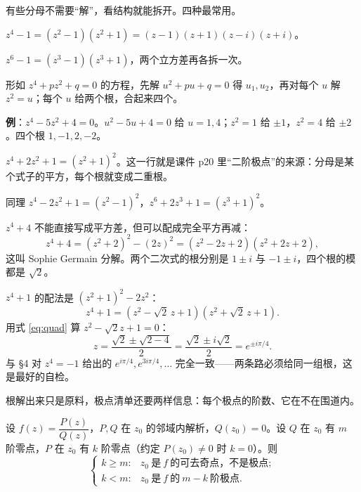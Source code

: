 \documentclass[11pt]{ctexart}
\let\origsubhdr\subhdr
\renewcommand{\subhdr}[1]{\par\needspace{4\baselineskip}\origsubhdr{#1}}
\let\orighdr\hdr
\renewcommand{\hdr}[2]{\par\orighdr{#1}{#2}}
\begin{document}


有些分母不需要“解”，看结构就能拆开。四种最常用。


$z^{4}-1=(z^{2}-1)(z^{2}+1)=(z-1)(z+1)(z-i)(z+i)$。

$z^{6}-1=(z^{3}-1)(z^{3}+1)$，两个立方差再各拆一次。


形如 $z^{4}+pz^{2}+q=0$ 的方程，先解 $u^{2}+pu+q=0$ 得 $u_1,u_2$，再对每个 $u$ 解 $z^{2}=u$；每个 $u$ 给两个根，合起来四个。

\textbf{例}：$z^{4}-5z^{2}+4=0$。$u^{2}-5u+4=0$ 给 $u=1,4$；$z^{2}=1$ 给 $\pm1$，$z^{2}=4$ 给 $\pm2$。四个根 $1,-1,2,-2$。


$z^{4}+2z^{2}+1=(z^{2}+1)^{2}$。这一行就是课件 p20 里“二阶极点”的来源：分母是某个式子的平方，每个根就变成二重根。

同理 $z^{4}-2z^{2}+1=(z^{2}-1)^{2}$，$z^{6}+2z^{3}+1=(z^{3}+1)^{2}$。


$z^{4}+4$ 不能直接写成平方差，但可以配成完全平方再减：
\[ z^{4}+4=(z^{2}+2)^{2}-(2z)^{2}=(z^{2}-2z+2)(z^{2}+2z+2), \]
这叫 Sophie Germain 分解。两个二次式的根分别是 $1\pm i$ 与 $-1\pm i$，四个根的模都是 $\sqrt2$。

$z^{4}+1$ 的配法是 $(z^{2}+1)^{2}-2z^{2}$：
\[ z^{4}+1=(z^{2}-\sqrt2\,z+1)(z^{2}+\sqrt2\,z+1). \]
用式 \eqref{eq:quad} 算 $z^{2}-\sqrt2z+1=0$：
\[ z=\frac{\sqrt2\pm\sqrt{2-4}}{2}=\frac{\sqrt2\pm i\sqrt2}{2}=e^{\pm i\pi/4}. \]
与 §4 对 $z^{4}=-1$ 给出的 $e^{i\pi/4},e^{3i\pi/4},\dots$ 完全一致——两条路必须给同一组根，这是最好的自检。



根解出来只是原料，极点清单还要两样信息：每个极点的阶数、它在不在围道内。


设 $f(z)=\dfrac{P(z)}{Q(z)}$，$P,Q$ 在 $z_0$ 的邻域内解析，$Q(z_0)=0$。设 $Q$ 在 $z_0$ 有 $m$ 阶零点，$P$ 在 $z_0$ 有 $k$ 阶零点（约定 $P(z_0)\ne0$ 时 $k=0$）。则
\begin{equation}
\begin{cases}
k\ge m: & z_0\ \text{是}\ f\ \text{的可去奇点，不是极点};\\[2pt]
k<m:  & z_0\ \text{是}\ f\ \text{的}\ m-k\ \text{阶极点}.
\end{cases}
\label{eq:order}
\end{equation}
\end{document}
